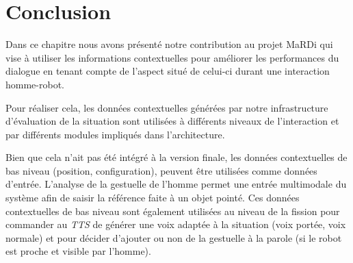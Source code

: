 \documentclass[a4paper,11pt,twoside]{StyleThese}
\begin{document}





\section{Conclusion}
\label{sec:chap3conclusion}
Dans ce chapitre nous avons présenté notre contribution au projet MaRDi qui vise à utiliser les informations contextuelles pour améliorer les performances du dialogue en tenant compte de l'aspect situé de celui-ci durant une interaction homme-robot.

Pour réaliser cela, les données contextuelles générées par notre infrastructure d'évaluation de la situation sont utilisées à différents niveaux de l'interaction et par différents modules impliqués dans l'architecture.

Bien que cela n'ait pas été intégré à la version finale, les données contextuelles de bas niveau (position, configuration), peuvent être utilisées comme données d'entrée. L'analyse de la gestuelle de l'homme permet une entrée multimodale du système afin de saisir la référence faite à un objet pointé. Ces données contextuelles de bas niveau sont également utilisées au niveau de la fission pour commander au \textit{TTS} de générer une voix adaptée à la situation (voix portée, voix normale) et pour décider d'ajouter ou non de la gestuelle à la parole (si le robot est proche et visible par l'homme).
\end{document}
